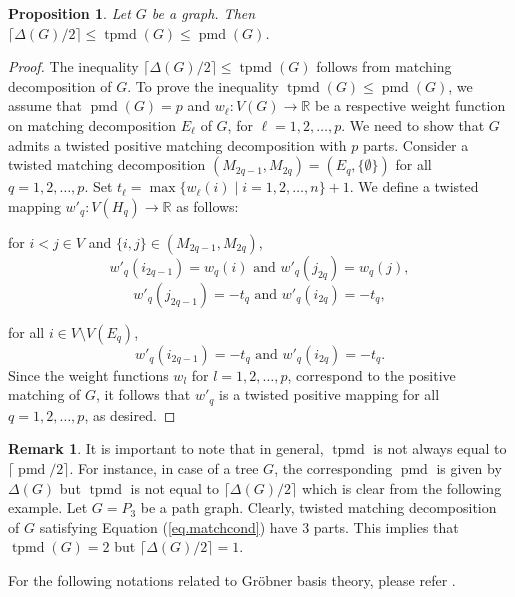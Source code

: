 \documentclass[11pt,a4paper,reqno]{amsart}
\newtheorem{prop}[thm]{Proposition}
\theoremstyle{definition}
\newtheorem{remark}[thm]{Remark}
\numberwithin{equation}{section}
\DeclareMathOperator{\pmd}{pmd}
\DeclareMathOperator{\tpmd}{tpmd}
\begin{document}
\begin{prop} \label{compare}
    Let $G$ be a graph. Then $\lceil \Delta(G)/2 \rceil \leq \tpmd(G)\leq \pmd(G)$.
\end{prop}
\begin{proof}
    The inequality $\lceil \Delta(G)/2 \rceil \leq \tpmd(G)$ follows from matching decomposition of $G$. To prove the inequality $\tpmd(G)\leq \pmd(G)$, we assume that $\pmd(G)=p$ and $w_\ell:V(G) \rightarrow \mathbb{R}$ be a respective weight function on matching decomposition $E_\ell$ of $G$, for $\ell = 1,2,\ldots, p$. We need to show that $G$ admits a twisted positive matching decomposition with $p$ parts. Consider a twisted matching decomposition $(M_{2q-1},M_{2q})=(E_q,\{\emptyset \})$ for all $q = 1,2,\ldots, p$. Set $t_\ell=\max\{w_\ell(i)\mid i=1,2,\ldots, n\}+1$. We define a twisted mapping $w'_q:V(H_q) \rightarrow \mathbb{R}$ as follows:
    
    for $i<j \in V$ and $\{i,j\}\in (M_{2q-1},M_{2q})$,  
    $$w'_q(i_{2q-1})=w_q(i) \text{ and } w'_q(j_{2q})=w_q(j),$$
    $$w'_q(j_{2q-1})=-t_q \text{ and } w'_q(i_{2q})=-t_q,$$

    for all $i \in V\setminus V(E_q)$,
    $$w'_q(i_{2q-1})=-t_q \text{ and } w'_q(i_{2q})=-t_q.$$
    Since the weight functions $w_l$ for $l=1,2, \ldots, p$, correspond to the positive matching of $G$, it follows that $w'_q$ is a twisted positive mapping for all $q=1,2,\ldots, p$, as desired.
\end{proof}


\begin{remark}
It is important to note that in general, $\tpmd$ is not always equal to $\lceil \pmd/2 \rceil$. For instance, in case of a tree $G$, the corresponding $\pmd$ is given by $\Delta(G)$ but $\tpmd$ is not equal to $\lceil \Delta(G)/2 \rceil$ which is clear from the following example. 
Let $G=P_3$ be a path graph. Clearly, twisted matching decomposition of $G$ satisfying Equation (\ref{eq.matchcond}) have $3$ parts. This implies that $\tpmd(G)=2$ but $\lceil \Delta(G)/2 \rceil = 1$.  
\end{remark}








For the following notations related to Gr\"obner basis theory, please refer \cite{Bruns&Conca}.
\end{document}
